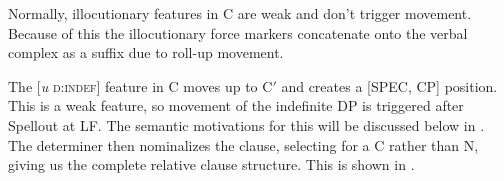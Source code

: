 \documentclass[output=paper]{LSP/langsci}
\begin{document}
\ea	\label{boyle37}
{\hspace{1em}}\newline

\z

Normally, illocutionary features in C are weak and don't trigger movement. Because of this the illocutionary force markers concatenate onto the verbal complex as a suffix due to roll-up movement.  

The [\textit{u} \textsc{d:indef}] feature in C moves up to C$'$ and creates a [SPEC, CP] position. This is a weak feature, so movement of the indefinite DP is triggered after Spellout at LF. The semantic motivations for this will be discussed below in . The determiner then nominalizes the clause, selecting for a C rather than N, giving us the complete relative clause structure. This is shown in .  

\ea\label{boyle38}
{\hspace{1em}}\newline

\z          
      
\end{document}
